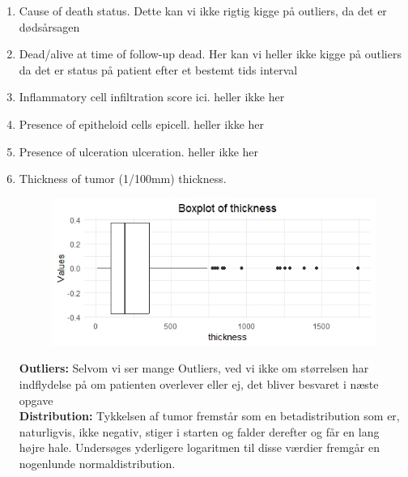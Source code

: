 \begin{enumerate}
\item Cause of death status. \newline
Dette kan vi ikke rigtig kigge på outliers, da det er dødsårsagen 
\item Dead/alive at time of follow-up dead. \newline
Her kan vi heller ikke kigge på outliers da det er status på patient efter et bestemt tids interval
\item Inflammatory cell infiltration score ici. \newline
heller ikke her
\item Presence of epitheloid cells epicell. \newline
heller ikke her
\item Presence of ulceration ulceration. \newline
heller ikke her
\item Thickness of tumor (1/100mm) thickness.\\
\begin{figure}
    \centering
    \includegraphics[width=0.5\linewidth]{Project/BIlleder_Duration/Thickness_Outliers.jpeg}
\end{figure}
\textbf{Outliers: }Selvom vi ser mange Outliers, ved vi ikke om størrelsen har indflydelse på om patienten overlever eller ej, det bliver besvaret i næste opgave\\
\textbf{Distribution: } Tykkelsen af tumor fremstår som en betadistribution som er, naturligvis, ikke negativ, stiger i starten og falder derefter og får en lang højre hale. Undersøges yderligere logaritmen til disse værdier fremgår en nogenlunde normaldistribution.\\


\end{enumerate}
